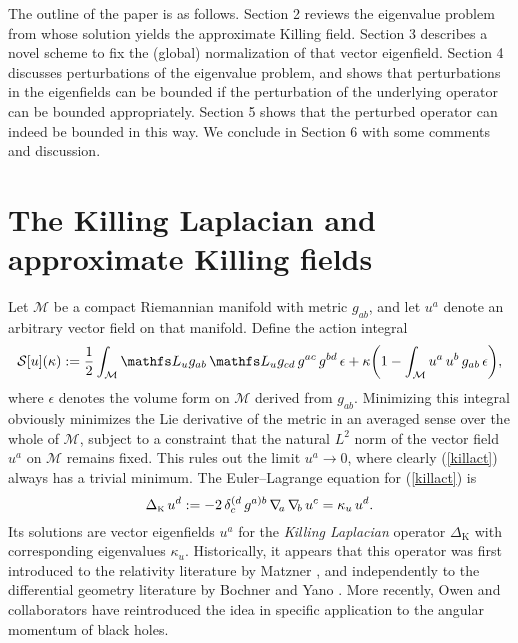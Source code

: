 \documentclass[12pt,letterpaper]{iopart}
\newcommand\Lap[1][K]{\Delta_{\scriptscriptstyle\mathrm{#1}}}
\newcommand\defn[1]{{\slshape #1\/}}
\begin{document}
The outline of the paper is as follows.  Section 2 reviews the eigenvalue problem from \cite{Matzner, Lovelace, Beetle} whose solution yields the approximate Killing field.  Section 3 describes a novel scheme to fix the (global) normalization of that vector eigenfield.  Section 4 discusses perturbations of the eigenvalue problem, and shows that perturbations in the eigenfields can be bounded if the perturbation of the underlying operator can be bounded appropriately.  Section 5 shows that the perturbed operator can indeed be bounded in this way.  We conclude in Section 6 with some comments and discussion.



\section{The Killing Laplacian and approximate Killing fields}

Let $\mathcal{M}$ be a compact Riemannian manifold with metric $g_{ab}$, and let $u^a$ denote an arbitrary vector field on that manifold.  Define the action integral 
%
\begin{equation}\label{killact}
	\mathcal{S}[u](\kappa) 
		:= \frac{1}{2} \int_{\mathcal{M}} \Lie_u g_{ab}\, \Lie_u g_{cd}\, g^{ac}\, g^{bd}\, \epsilon
			+ \kappa \biggl( 1 - \int_{\mathcal{M}} u^a\, u^b\, g_{ab}\, \epsilon \biggr),
\end{equation}
%
where $\epsilon$ denotes the volume form on $\mathcal{M}$ derived from $g_{ab}$.  Minimizing this integral obviously minimizes the Lie derivative of the metric in an averaged sense over the whole of $\mathcal{M}$, subject to a constraint that the natural $L^2$ norm of the vector field $u^a$ on $\mathcal{M}$ remains fixed.  This rules out the limit $u^a \to 0$, where clearly  (\ref{killact}) always has a trivial minimum.   The Euler--Lagrange equation for (\ref{killact}) is 
%
\begin{equation}\label{killlap}
	\Lap\, u^d := - 2\, \delta^{(d}_c\, g^{a)b}\, \grad\!_a\, \grad\!_b\, u^c = \kappa_u\, u^d.
\end{equation}
%
Its solutions are vector eigenfields $u^a$ for the \defn{Killing Laplacian} operator $\Lap$ with corresponding eigenvalues $\kappa_u$.  Historically, it appears that this operator was first introduced to the relativity literature by Matzner \cite{Matzner}, and independently to the differential geometry literature by Bochner and Yano \cite{Yano}.  More recently, Owen and collaborators \cite{Lovelace} have reintroduced the idea in specific application to the angular momentum of black holes.
\end{document}
